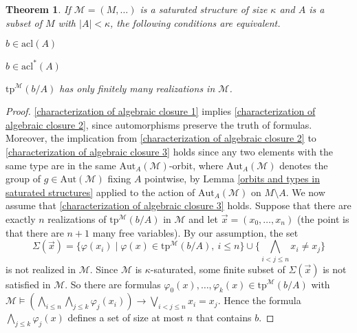 \documentclass[10pt]{amsart}
\newcommand{\M}{\mathcal{M}}
\newcommand{\MM}{\mathcal{M}}
\newcommand{\acl}{\mathrm{acl}}
\newcommand{\tp}{\mathrm{tp}}
\newcommand{\Aut}{\mathrm{Aut}}
\newtheorem{theorem}{Theorem}[subsection]
\newtheorem{problem}[theorem]{Problem}
\theoremstyle{definition}
\theoremstyle{remark}
\newenvironment{enumerate-(a)}{\begin{enumerate}[label={\upshape (\alph*)}, leftmargin=2pc]}{\end{enumerate}}
\begin{document}
\begin{theorem} \label{characterization of algebraic closure} 
If $\MM=(M,\dots)$ is a saturated structure of size $\kappa$ and $A$ is a subset of $M$ with $|A|<\kappa$, the following conditions are equivalent. 
\begin{enumerate-(a)} 
\item \label{characterization of algebraic closure 1} 
$b\in \acl(A)$ 
\item \label{characterization of algebraic closure 2} 
$b\in \acl^*(A)$ 
\item \label{characterization of algebraic closure 3} 
$\tp^\MM(b/A)$ has only finitely many realizations in $\MM$. 
\end{enumerate-(a)} 
\end{theorem} 
\begin{proof} 
\ref{characterization of algebraic closure 1} implies \ref{characterization of algebraic closure 2}, since automorphisms preserve the truth of formulas. Moreover, the implication from \ref{characterization of algebraic closure 2} to \ref{characterization of algebraic closure 3} holds since any two elements with the same type are in the same $\Aut_A(\MM)$-orbit, where $\Aut_A(\MM)$ denotes the group of $g\in \Aut(\MM)$ fixing $A$ pointwise, by Lemma \ref{orbits and types in saturated structures} applied to the action of $\Aut_A(\MM)$ on $M\setminus A$. 
We now assume that \ref{characterization of algebraic closure 3} holds. Suppose that there are exactly $n$ realizations of $\tp^{\MM}(b/A)$ in $\MM$ and let $\vec{x}=(x_0,\dots,x_n)$ (the point is that there are $n+1$ many free variables). By our assumption, the set $$\Sigma(\vec{x})=\{\varphi(x_i)\mid \varphi(x)\in\tp^\MM(b/A),\ i\leq n\}\cup\{\bigwedge_{i<j\leq n}x_i\neq x_j\}$$ 
is not realized in $\MM$. Since $\MM$ is $\kappa$-saturated, some finite subset of $\Sigma(\vec{x})$ is not satisfied in $\MM$. So there are formulas $\varphi_0(x), \dots, \varphi_k(x)\in \tp^\M(b/A)$ with $\MM\models (\bigwedge_{i\leq n}\bigwedge_{j\leq k}\varphi_j(x_i))\rightarrow \bigvee_{i<j\leq n} x_i=x_j$. Hence the formula $\bigwedge_{j\leq k}\varphi_j(x)$ defines a set of size at most $n$ that contains $b$. 
\end{proof} 

\end{document}
